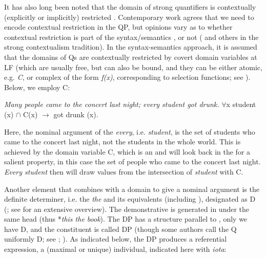 \documentclass[output=paper,
modfonts
]{langscibook}
\begin{document}
It has also long been noted that the domain of strong quantifiers is contextually (explicitly or implicitly) restricted \citep[see \textit{inter alia}][]{reuland-termeulen1987}. Contemporary work agrees that we need to encode contextual restriction in the QP, but opinions vary as to whether contextual restriction is part of the syntax/semantics \citep{Partee1987, Fintel1994, vonfintel1998, stanley-szabo2000, stanley2002, matthewson2001, marti2003, Giannakidou2004, etxeberria2005, etxeberria2008, etxeberria2009, gillon2006, gillon2009, etxeberria-giannakidou2009, etxeberria-giannakidou2014, giannakidou-rathert2009}, or not (\citealt{recanati1996, recanati2004, recanati2007} and others in the strong contextualism tradition). In the syntax-semantics approach, it is  assumed that the domains of Qs are contextually restricted by covert domain variables at LF (which are usually free, but can also be bound, and they can be  either atomic, e.g. \textit{C}, or complex of the form \textit{f(x)}, corresponding to selection functions; see \citealt{vonfintel1998,stanley2002,marti2003}). Below, we employ C:

\begin{exe}
\ex \label{ex:etxeberria:2} \textit{Many people came to the concert last night; every student got drunk.}
\ex \label{ex:exteberria:3}
$\forall$x {\ob} student (x) $\cap$ C(x) {\cb} $\rightarrow$ got drunk (x).
\end{exe}

Here, the nominal argument of the  \textit{every}, i.e. \textit{student}, is the set of students who came to the concert last night, not the students in the whole world. This is achieved by the domain variable C, which is an  and will look back in the  for a salient property, in this case the set of people who came to the concert last night. \textit{Every student} then will draw values from the intersection of \textit{student} with C.

Another element that combines with a domain to give a nominal argument is the definite determiner, i.e. the  \textit{the} and its equivalents (including ), designated as D (\citealt{abney1987}; see \citealt{AlexiadouEtAlii2008} for an extensive overview). The demonstrative is generated in  under the same head (thus *\textit{this the book}). The DP has a structure parallel to , only  we have D, and the constituent is called DP (though some authors call the Q uniformly D; see \citealt{matthewson1998}; \citealt{gillon2009}). As indicated below, the DP produces a referential expression, a (maximal or unique) individual, indicated here with \textit{iota}:
\end{document}

